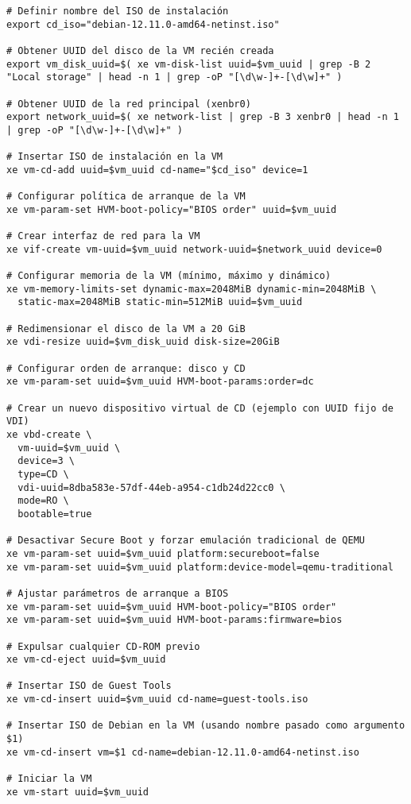 \begin{verbatim}
# Definir nombre del ISO de instalación
export cd_iso="debian-12.11.0-amd64-netinst.iso"

# Obtener UUID del disco de la VM recién creada
export vm_disk_uuid=$( xe vm-disk-list uuid=$vm_uuid | grep -B 2 "Local storage" | head -n 1 | grep -oP "[\d\w-]+-[\d\w]+" )

# Obtener UUID de la red principal (xenbr0)
export network_uuid=$( xe network-list | grep -B 3 xenbr0 | head -n 1 | grep -oP "[\d\w-]+-[\d\w]+" )

# Insertar ISO de instalación en la VM
xe vm-cd-add uuid=$vm_uuid cd-name="$cd_iso" device=1

# Configurar política de arranque de la VM
xe vm-param-set HVM-boot-policy="BIOS order" uuid=$vm_uuid

# Crear interfaz de red para la VM
xe vif-create vm-uuid=$vm_uuid network-uuid=$network_uuid device=0

# Configurar memoria de la VM (mínimo, máximo y dinámico)
xe vm-memory-limits-set dynamic-max=2048MiB dynamic-min=2048MiB \
  static-max=2048MiB static-min=512MiB uuid=$vm_uuid

# Redimensionar el disco de la VM a 20 GiB
xe vdi-resize uuid=$vm_disk_uuid disk-size=20GiB

# Configurar orden de arranque: disco y CD
xe vm-param-set uuid=$vm_uuid HVM-boot-params:order=dc

# Crear un nuevo dispositivo virtual de CD (ejemplo con UUID fijo de VDI)
xe vbd-create \
  vm-uuid=$vm_uuid \
  device=3 \
  type=CD \
  vdi-uuid=8dba583e-57df-44eb-a954-c1db24d22cc0 \
  mode=RO \
  bootable=true

# Desactivar Secure Boot y forzar emulación tradicional de QEMU
xe vm-param-set uuid=$vm_uuid platform:secureboot=false
xe vm-param-set uuid=$vm_uuid platform:device-model=qemu-traditional

# Ajustar parámetros de arranque a BIOS
xe vm-param-set uuid=$vm_uuid HVM-boot-policy="BIOS order"
xe vm-param-set uuid=$vm_uuid HVM-boot-params:firmware=bios

# Expulsar cualquier CD-ROM previo
xe vm-cd-eject uuid=$vm_uuid

# Insertar ISO de Guest Tools
xe vm-cd-insert uuid=$vm_uuid cd-name=guest-tools.iso

# Insertar ISO de Debian en la VM (usando nombre pasado como argumento $1)
xe vm-cd-insert vm=$1 cd-name=debian-12.11.0-amd64-netinst.iso

# Iniciar la VM
xe vm-start uuid=$vm_uuid
\end{verbatim}